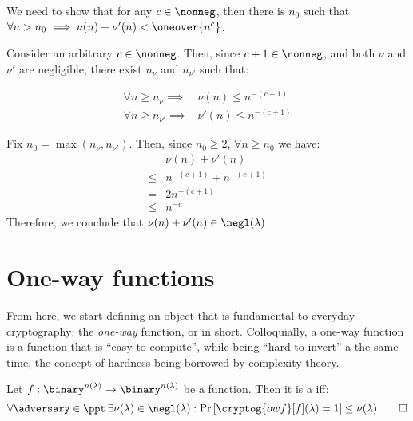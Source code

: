 \begin{solution}[\ref{ex:negl}]

    
    We need to show that for any $c \in \nonneg $, then there is $n_0$ such that $\forall n > n_{0} \implies \nu(n) + \nu'(n) < \oneover{n^c}$.
    
    Consider an arbitrary $c \in \nonneg$. Then, since $c + 1 \in \nonneg$, and both $\nu$ and $\nu'$ are negligible, there exist $n_\nu$ and $n_{\nu'}$ such that:
    
    \begin{align*}
        \forall n \geq n_{\nu} \implies& \nu(n) \leq n^{-(c+1)} \\
        \forall n \geq n_{\nu'} \implies& \nu'(n) \leq n^{-(c+1)}
    \end{align*}

    Fix $n_{0} = \max(n_{\nu}, n_{\nu'})$. Then, since $n_0 \geq 2$, $\forall n \geq n_0$ we have:
    \begin{align*}
        & \nu(n) + \nu'(n) \\
        \leq& n^{-(c+1)} + n^{-(c+1)} \\
        =& 2n^{-(c+1)} \\
        \leq& n^{-c}
    \end{align*}
    Therefore, we conclude that $\nu(n) + \nu'(n) \in \negl(\lambda)$.
\end{solution}


\section{One-way functions}

From here, we start defining an object that is fundamental to everyday cryptography: the \emph{one-way} function, or \owf{} in short. Colloquially, a one-way function is a function that is ``easy to compute'', while being ``hard to invert'' a the same time, the concept of hardness being borrowed by complexity theory.

\begin{definition}    
    Let $f : \binary^{n(\lambda)} \to \binary^{n(\lambda)}$ be a function. Then it is a \owf{} iff:
    \[
        \forall \adversary \in \ppt\, \exists \nu(\lambda) \in \negl(\lambda) : \Pr\left[\cryptog{owf}[f](\lambda) = 1 \right] \leq \nu(\lambda) \qedhere
    \]
\end{definition}


